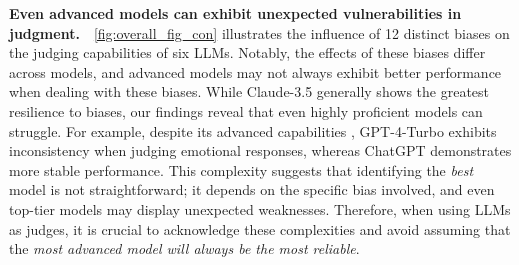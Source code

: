 \documentclass{article} %
\newcommand{\header}[1]{\noindent\textbf{{#1}}~~}
\begin{document}
\header{Even advanced models can exhibit unexpected vulnerabilities in judgment.}\autoref{fig:overall_fig_con}  illustrates the influence of 12 distinct biases on the judging capabilities of six LLMs. Notably, the effects of these biases differ across models, and advanced models may not always exhibit better performance when dealing with these biases. While Claude-3.5 generally shows the greatest resilience to biases, our findings reveal that even highly proficient models can struggle. For example, despite its advanced capabilities \citep{lmsysChat}, GPT-4-Turbo exhibits inconsistency when judging emotional responses, whereas ChatGPT demonstrates more stable performance. This complexity suggests that identifying the \textit{best} model is not straightforward; it depends on the specific bias involved, and even top-tier models may display unexpected weaknesses. Therefore, when using LLMs as judges, it is crucial to acknowledge these complexities and avoid assuming that the \textit{most advanced model will always be the most reliable}.
\end{document}
